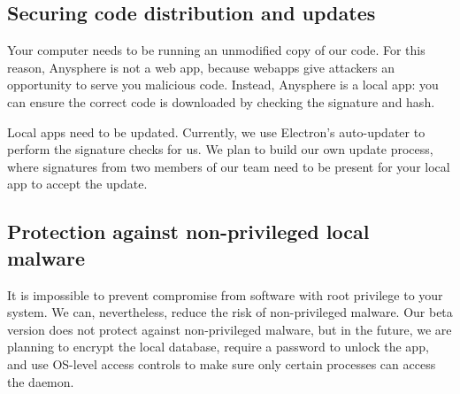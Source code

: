 \subsection{Securing code distribution and updates}

Your computer needs to be running an unmodified copy of our code. For this reason, Anysphere is not a web app, because webapps give attackers an opportunity to serve you malicious code. Instead, Anysphere is a local app: you can ensure the correct code is downloaded by checking the signature and hash.



Local apps need to be updated. Currently, we use Electron's auto-updater to perform the signature checks for us. We plan to build our own update process, where signatures from two members of our team need to be present for your local app to accept the update. 


\subsection{Protection against non-privileged local malware}

It is impossible to prevent compromise from software with root privilege to your system. We can, nevertheless, reduce the risk of non-privileged malware. Our beta version does not protect against non-privileged malware, but in the future, we are planning to encrypt the local database, require a password to unlock the app, and use OS-level access controls to make sure only certain processes can access the daemon.

